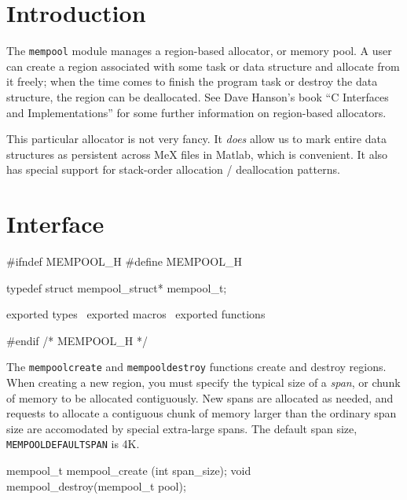 
\section{Introduction}

The {\tt{}mempool} module manages a region-based allocator,
or memory pool.  A user can create a region associated with
some task or data structure and allocate from it freely;
when the time comes to finish the program task or destroy
the data structure, the region can be deallocated.
See Dave Hanson's book ``C Interfaces and Implementations'' %
for some further information on region-based allocators.

This particular allocator is not very fancy.  It \emph{does}
allow us to mark entire data structures as persistent across
MeX files in Matlab, which is convenient.  It also has special
support for stack-order allocation / deallocation patterns.


\section{Interface}

\endmoddef
#ifndef MEMPOOL_H
#define MEMPOOL_H

typedef struct mempool_struct* mempool_t;

\LA{}exported types~{\nwtagstyle{}}\RA{}
\LA{}exported macros~{\nwtagstyle{}}\RA{}
\LA{}exported functions~{\nwtagstyle{}}\RA{}

#endif /* MEMPOOL_H */
\nwendcode{}\nwdocspar

The {\tt{}mempool{}create} and {\tt{}mempool{}destroy}
functions create and destroy regions.  When creating a new
region, you must specify the typical size of a \emph{span},
or chunk of memory to be allocated contiguously.  New spans
are allocated as needed, and requests to allocate a contiguous
chunk of memory larger than the ordinary span size are accomodated
by special extra-large spans.  The default span size,
{\tt{}MEMPOOL{}DEFAULT{}SPAN} is 4K.

\nwenddocs{}\endmoddef
mempool_t mempool_create (int span_size);
void      mempool_destroy(mempool_t pool);

